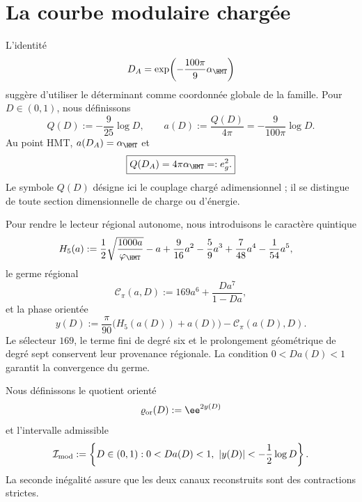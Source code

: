 \section{La courbe modulaire chargée}

L’identité
\begin{equation}
 D_A=\exp\!\left(-\frac{100\pi}{9}\alpha_{\HMT}\right)
 \label{rm:eq:curve-D-alpha}
\end{equation}
suggère d’utiliser le déterminant comme coordonnée globale de la famille. Pour \(D\in(0,1)\), nous définissons
\begin{equation}
 \boxed{
 Q(D):=-\frac9{25}\log D,}
 \qquad
 a(D):=\frac{Q(D)}{4\pi}
 =-\frac9{100\pi}\log D.
 \label{rm:eq:curve-Q-a}
\end{equation}
Au point HMT, \(a(D_A)=\alpha_{\HMT}\) et
\begin{equation}
 \boxed{Q(D_A)=4\pi\alpha_{\HMT}=:e_g^2.}
 \label{rm:eq:curve-Q-gauge}
\end{equation}
Le symbole \(Q(D)\) désigne ici le couplage chargé adimensionnel ; il se distingue de toute section dimensionnelle de charge ou d’énergie.

Pour rendre le lecteur régional autonome, nous introduisons le caractère quintique
\begin{equation}
 \begin{aligned}
 H_5(a):={}&\frac12\sqrt{\frac{1000a}{\varphi_{\HMT}}}-a
 +\frac9{16}a^2-\frac59a^3
 +\frac7{48}a^4-\frac1{54}a^5,
 \end{aligned}
 \label{rm:eq:curve-H5}
\end{equation}
le germe régional
\begin{equation}
 \mathcal C_\pi(a,D)
 :=169a^6+\frac{Da^7}{1-Da},
 \label{rm:eq:curve-Cpi}
\end{equation}
et la phase orientée
\begin{equation}
 y(D):=\frac{\pi}{90}\bigl(H_5(a(D))+a(D)\bigr)
 -\mathcal C_\pi(a(D),D).
 \label{rm:eq:curve-yD}
\end{equation}
Le sélecteur \(169\), le terme fini de degré six et le prolongement géométrique de degré sept conservent leur provenance régionale. La condition \(0<Da(D)<1\) garantit la convergence du germe.

Nous définissons le quotient orienté
\begin{equation}
 \varrho_{\rm or}(D):=\ee^{2y(D)}
 \label{rm:eq:curve-rho-or}
\end{equation}
et l’intervalle admissible
\begin{equation}
 \mathcal I_{\rm mod}:=
 \left\{D\in(0,1):
 0<Da(D)<1,
 \ |y(D)|<-\frac12\log D
 \right\}.
 \label{rm:eq:curve-domain}
\end{equation}
La seconde inégalité assure que les deux canaux reconstruits sont des contractions strictes.

